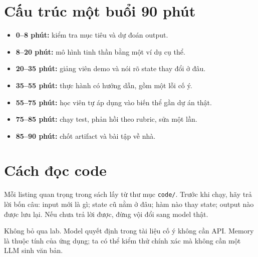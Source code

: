 \section*{Cấu trúc một buổi 90 phút}

\begin{itemize}
  \item \textbf{0--8 phút:} kiểm tra mục tiêu và dự đoán output.
  \item \textbf{8--20 phút:} mô hình tinh thần bằng một ví dụ cụ thể.
  \item \textbf{20--35 phút:} giảng viên demo và nói rõ state thay đổi ở đâu.
  \item \textbf{35--55 phút:} thực hành có hướng dẫn, gồm một lỗi cố ý.
  \item \textbf{55--75 phút:} học viên tự áp dụng vào biến thể gần dự án thật.
  \item \textbf{75--85 phút:} chạy test, phản hồi theo rubric, sửa một lần.
  \item \textbf{85--90 phút:} chốt artifact và bài tập về nhà.
\end{itemize}

\section*{Cách đọc code}

Mỗi listing quan trọng trong sách lấy từ thư mục \texttt{code/}. Trước khi chạy, hãy trả lời bốn
câu: input mới là gì; state cũ nằm ở đâu; hàm nào thay state; output nào được lưu lại. Nếu chưa
trả lời được, đừng vội đổi sang model thật.

\begin{aiwarning}
Không bỏ qua lab. Model quyết định trong tài liệu cố ý không cần API. Memory là thuộc tính của
ứng dụng; ta có thể kiểm thử chính xác mà không cần một LLM sinh văn bản.
\end{aiwarning}
